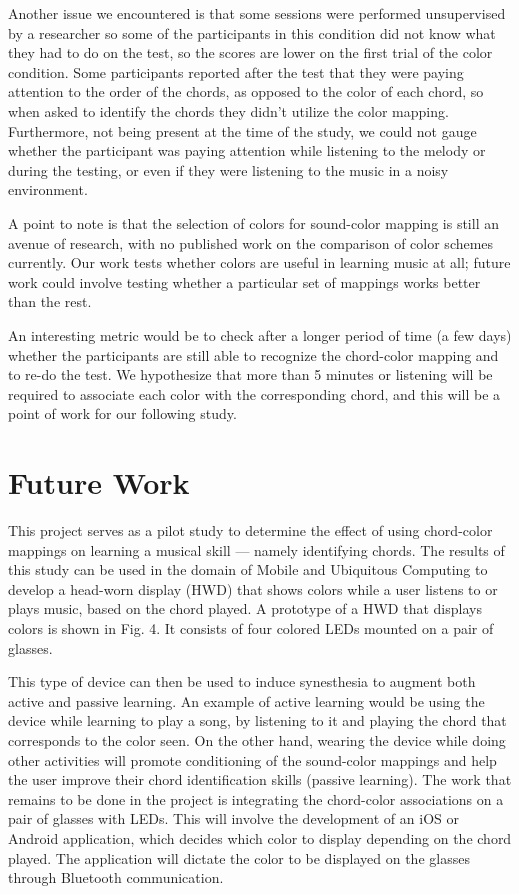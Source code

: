 \documentclass{sigchi}
\begin{document}
Another issue we encountered is that some sessions were performed unsupervised by a researcher so some of the participants in this condition did not know what they had to do on the test, so the scores are lower on the first trial of the color condition. Some participants reported after the test that they were paying attention to the order of the chords, as opposed to the color of each chord, so when asked to identify the chords they didn’t utilize the color mapping. Furthermore, not being present at the time of the study, we could not gauge whether the participant was paying attention while listening to the melody or during the testing, or even if they were listening to the music in a noisy environment. 

A point to note is that the selection of colors for sound-color mapping is still an avenue of research, with no published work on the comparison of color schemes currently. Our work tests whether colors are useful in learning music at all; future work could involve testing whether a particular set of mappings works better than the rest.

An interesting metric would be to check after a longer period of time (a few days) whether the participants are still able to recognize the chord-color mapping and to re-do the test. We hypothesize that more than 5 minutes or listening will be required to associate each color with the corresponding chord, and this will be a point of work for our following study.

\section{Future Work}

This project serves as a pilot study to determine the effect of using chord-color mappings on learning a musical skill — namely identifying chords. The results of this study can be used in the domain of Mobile and Ubiquitous Computing to develop a head-worn display (HWD) that shows colors while a user listens to or plays music, based on the chord played. A prototype of a HWD that displays colors is shown in Fig. 4. It consists of four colored LEDs mounted on a pair of glasses.

This type of device can then be used to induce synesthesia to augment both active and passive learning. An example of active learning would be using the device while learning to play a song, by listening to it and playing the chord that corresponds to the color seen. On the other hand, wearing the device while doing other activities will promote conditioning of the sound-color mappings and help the user improve their chord identification skills (passive learning). 
The work that remains to be done in the project is integrating the chord-color associations on a pair of glasses with LEDs. This will involve the development of an iOS or Android application, which decides which color to display depending on the chord played. The application will dictate the color to be displayed on the glasses through Bluetooth communication.
\end{document}
